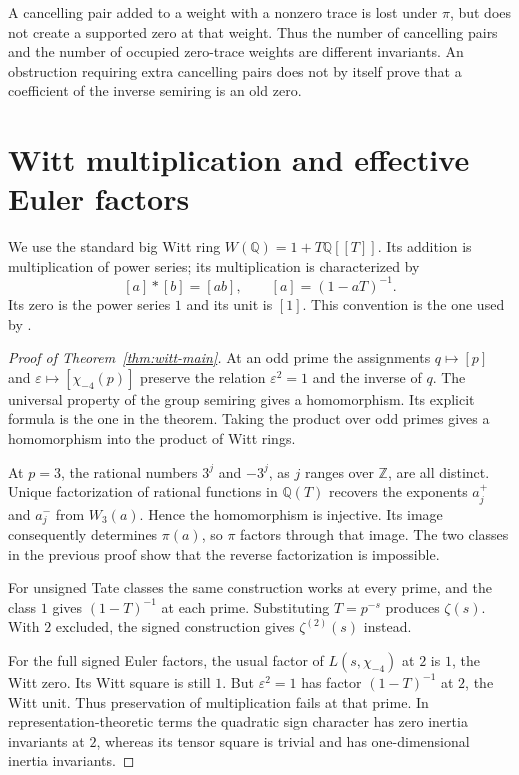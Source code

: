 \documentclass[11pt]{article}
\newcommand{\Z}{\mathbb Z}\newcommand{\N}{\mathbb N}\newcommand{\Q}{\mathbb Q}
\newcommand{\eps}{\varepsilon}\newcommand{\supp}{\operatorname{supp}}
\theoremstyle{definition}\newtheorem{definition}[theorem]{Definition}
\begin{document}
\begin{remark}
A cancelling pair added to a weight with a nonzero trace is lost under $\pi$, but does not create a supported zero at that weight. Thus the number of cancelling pairs and the number of occupied zero-trace weights are different invariants. An obstruction requiring extra cancelling pairs does not by itself prove that a coefficient of the inverse semiring is an old zero.
\end{remark}

\section{Witt multiplication and effective Euler factors}\label{sec:witt}
We use the standard big Witt ring $W(\Q)=1+T\Q[[T]]$. Its addition is multiplication of power series; its multiplication is characterized by
\[
 [a]\ast[b]=[ab],\qquad [a]=(1-aT)^{-1}.
\]
Its zero is the power series $1$ and its unit is $[1]$. This convention is the one used by \citet[\S1]{Ramachandran}.

\begin{proof}[Proof of Theorem~\ref{thm:witt-main}]
At an odd prime the assignments $q\mapsto[p]$ and $\eps\mapsto[\chi_{-4}(p)]$ preserve the relation $\eps^2=1$ and the inverse of $q$. The universal property of the group semiring gives a homomorphism. Its explicit formula is the one in the theorem. Taking the product over odd primes gives a homomorphism into the product of Witt rings.

At $p=3$, the rational numbers $3^j$ and $-3^j$, as $j$ ranges over $\Z$, are all distinct. Unique factorization of rational functions in $\Q(T)$ recovers the exponents $a_j^+$ and $a_j^-$ from $W_3(a)$. Hence the homomorphism is injective. Its image consequently determines $\pi(a)$, so $\pi$ factors through that image. The two classes in the previous proof show that the reverse factorization is impossible.

For unsigned Tate classes the same construction works at every prime, and the class $1$ gives $(1-T)^{-1}$ at each prime. Substituting $T=p^{-s}$ produces $\zeta(s)$. With $2$ excluded, the signed construction gives $\zeta^{(2)}(s)$ instead.

For the full signed Euler factors, the usual factor of $L(s,\chi_{-4})$ at $2$ is $1$, the Witt zero. Its Witt square is still $1$. But $\eps^2=1$ has factor $(1-T)^{-1}$ at $2$, the Witt unit. Thus preservation of multiplication fails at that prime. In representation-theoretic terms the quadratic sign character has zero inertia invariants at $2$, whereas its tensor square is trivial and has one-dimensional inertia invariants.
\end{proof}
\end{document}
